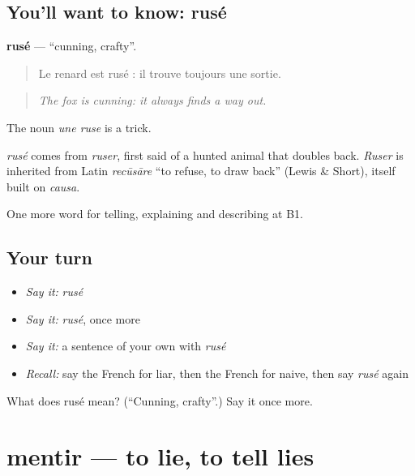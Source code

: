 \subsection*{You'll want to know: rusé}
\textbf{rusé} — \textquotedblleft{}cunning, crafty\textquotedblright{}.

\begin{quote}
Le renard est rusé : il trouve toujours une sortie.
\end{quote}

\begin{quote}
\emph{The fox is cunning: it always finds a way out.}
\end{quote}

The noun \emph{une ruse} is a trick.

\begin{cousinweb}
\emph{rusé} comes from \emph{ruser}, first said of a hunted animal that doubles back. \emph{Ruser} is inherited from Latin \emph{recūsāre} \textquotedblleft{}to refuse, to draw back\textquotedblright{} (Lewis \& Short), itself built on \emph{causa}.
\end{cousinweb}

\begin{grammarlens}[title={What you've built}]
One more word for telling, explaining and describing at B1.
\end{grammarlens}

\subsection*{Your turn}
\begin{itemize}
\raggedright
  \item \emph{Say it:} \emph{rusé}
  \item \emph{Say it:} \emph{rusé}, once more
  \item \emph{Say it:} a sentence of your own with \emph{rusé}
  \item \emph{Recall:} say the French for liar, then the French for naive, then say \emph{rusé} again
\end{itemize}

\begin{tcolorbox}[breakable,colback=teal!4,colframe=teal!35!black,title={Before you move on}]
What does rusé mean? (\textquotedblleft{}Cunning, crafty\textquotedblright{}.) Say it once more.
\end{tcolorbox}
\section[mentir]{mentir — to lie, to tell lies}

